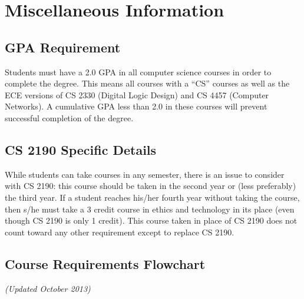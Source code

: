 \documentclass[10pt,letter,twocolumn]{book}
\newcommand{\mysection}[1]{\section{#1}\renewcommand{\rightmark}{#1}}
\begin{document}


\mysection{Miscellaneous Information}

\subsection{GPA Requirement}

Students must have a 2.0 GPA in all computer science courses in order to complete the degree.  This means all courses with a ``CS'' courses as well as the ECE versions of CS 2330 (Digital Logic Design) and CS 4457 (Computer Networks).  A cumulative GPA less than 2.0 in these courses will prevent successful completion of the degree.

\subsection{CS 2190 Specific Details}

While students can take courses in any semester, there is an issue to
consider with CS 2190: this course should be taken in the second year
or (less preferably) the third year. If a student reaches his/her
fourth year without taking the course, then s/he must take a 3 credit
course in ethics and technology in its place (even though CS 2190 is
only 1 credit). This course taken in place of CS 2190 does not count
toward any other requirement except to replace CS 2190.

\clearpage%
\begin{figure*}[h!]
\mysection{Course Requirements Flowchart}
{\em (Updated October 2013)}
\begin{center}
\end{center}
\end{figure*}
\end{document}
